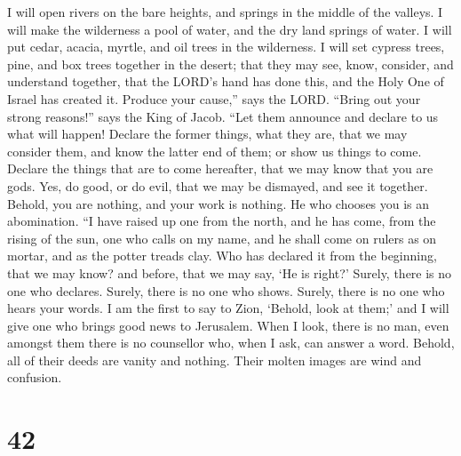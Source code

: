  I will open rivers on the bare heights, and springs in the
middle of the valleys. I will make the wilderness a pool of water, and
the dry land springs of water.  I will put cedar, acacia,
myrtle, and oil trees in the wilderness. I will set cypress trees, pine,
and box trees together in the desert;  that they may see,
know, consider, and understand together, that the LORD's hand has done
this, and the Holy One of Israel has created it.  Produce
your cause,'' says the LORD. ``Bring out your strong reasons!'' says the
King of Jacob.  ``Let them announce and declare to us what
will happen! Declare the former things, what they are, that we may
consider them, and know the latter end of them; or show us things to
come.  Declare the things that are to come hereafter, that
we may know that you are gods. Yes, do good, or do evil, that we may be
dismayed, and see it together.  Behold, you are nothing,
and your work is nothing. He who chooses you is an abomination.
 ``I have raised up one from the north, and he has come,
from the rising of the sun, one who calls on my name, and he shall come
on rulers as on mortar, and as the potter treads clay.  Who
has declared it from the beginning, that we may know? and before, that
we may say, `He is right?' Surely, there is no one who declares. Surely,
there is no one who shows. Surely, there is no one who hears your words.
 I am the first to say to Zion, `Behold, look at them;' and
I will give one who brings good news to Jerusalem.  When I
look, there is no man, even amongst them there is no counsellor who,
when I ask, can answer a word.  Behold, all of their deeds
are vanity and nothing. Their molten images are wind and confusion.

\hypertarget{section-40}{%
\section{42}\label{section-40}}


